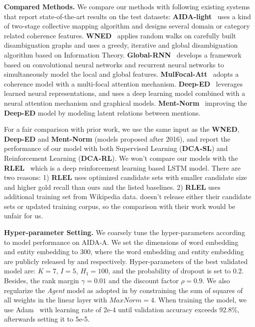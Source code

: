 \medskip
\noindent
\textbf{Compared Methods.}
We compare our methods with following existing systems that report state-of-the-art results on the test datasets: \textbf{AIDA-light}~\cite{nguyen2014aida} uses a kind of two-stage collective mapping algorithm and designs several domain or category related coherence features.
\textbf{WNED}~\cite{guo2016robust} applies random walks on carefully built disambiguation graphs and uses a greedy, iterative and global disambiguation algorithm based on Information Theory.
\textbf{Global-RNN}~\cite{nguyen2016joint} develops a framework based on convolutional neural networks and recurrent neural networks to simultaneously model the local and global features.
\textbf{MulFocal-Att}~\cite{globerson2016collective} adopts a coherence model with a multi-focal attention mechanism.
\textbf{Deep-ED}~\cite{ganea2017deep} leverages learned neural representations, and uses a deep learning model combined with a neural attention mechanism and graphical models.
\textbf{Ment-Norm}~\cite{le2018improving} improving the \textbf{Deep-ED} model by modeling latent relations between mentions.


For a fair comparison with prior work, we use the same input as the \textbf{WNED}, \textbf{Deep-ED} and \textbf{Ment-Norm} (models proposed after 2016), and report the performance of our model with both Supervised Learning (\textbf{DCA-SL}) and Reinforcement Learning (\textbf{DCA-RL}). We won't compare our models with the \textbf{RLEL}~\cite{fang2019joint} which is a deep reinforcement learning based LSTM model. There are two reasons: 1) \textbf{RLEL} uses optimized candidate sets with smaller candidate size and higher gold recall than ours and the listed baselines. 2) \textbf{RLEL} uses additional training set from Wikipedia data. \cite{fang2019joint} doesn't release either their candidate sets or updated training corpus, so the comparison with their work would be unfair for us.

\medskip
\noindent\textbf{Hyper-parameter Setting.} We coarsely tune the hyper-parameters according to model performance on AIDA-A. We set the dimensions of word embedding and entity embedding to 300, where the word embedding and entity embedding are publicly released by \cite{pennington2014glove} and  \cite{ganea2017deep} respectively. Hyper-parameters of the best validated model are: $K=7$, $I=5$, $H_1=100$, and the probability of dropout is set to 0.2. Besides, the rank margin $\gamma=0.01$ and the discount factor $\rho=0.9$. We also regularize the \emph{Agent} model as adopted in \cite{ganea2017deep} by constraining the sum of squares of all weights in the linear layer with $MaxNorm=4$. When training the model,  we use Adam~\cite{kingma2014adam} with learning rate of 2e-4 until validation accuracy exceeds 92.8\%, afterwards setting it to 5e-5. \\

